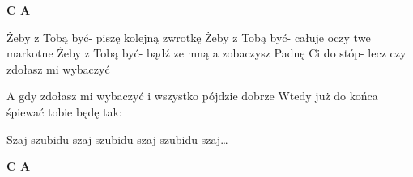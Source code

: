 \documentclass[../../../songbook.tex]{subfiles}
\begin{document}
{\color{red}\textbf{C A} } \newline

Żeby z Tobą być- piszę kolejną zwrotkę			\newline
Żeby z Tobą być- całuje oczy twe markotne			\newline
Żeby z Tobą być- bądź ze mną a zobaczysz			\newline
Padnę Ci do stóp- lecz czy zdołasz mi wybaczyć			\newline

A gdy zdołasz mi wybaczyć i wszystko pójdzie dobrze			\newline
Wtedy już do końca śpiewać tobie będę tak:			\newline

\-\hspace{1cm} Szaj szubidu szaj szubidu szaj szubidu szaj…			\newline

{\color{red}\textbf{C A} } \newline
\end{document}
